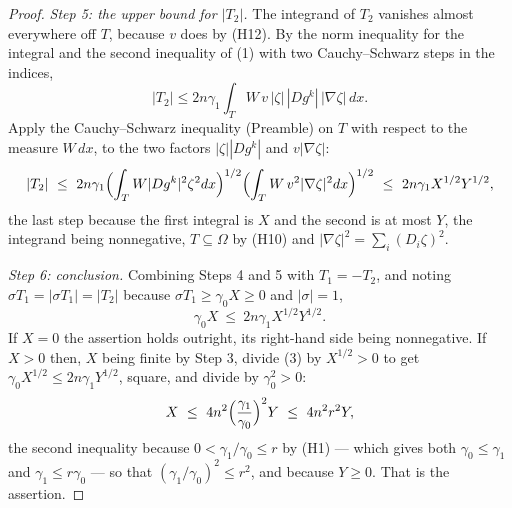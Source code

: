 \begin{proof}
\emph{Step 5: the upper bound for $|T_2|$.}  The integrand of $T_2$ vanishes
almost everywhere off $T$, because $v$ does by (H12).  By the norm inequality
for the integral and the second inequality of (1) with two Cauchy--Schwarz
steps in the indices,
\[
|T_2|\le2n\gamma_1\int_TW\,v\,|\zeta|\,|Dg^k|\,|\nabla\zeta|\,dx .
\]
Apply the Cauchy--Schwarz inequality (Preamble) on $T$ with respect to the
measure $W\,dx$, to the two factors $|\zeta||Dg^k|$ and $v|\nabla\zeta|$:
\[
|T_2|\ \le\ 2n\gamma_1
\Bigl(\int_TW|Dg^k|^2\zeta^2dx\Bigr)^{1/2}
\Bigl(\int_TW\,v^2|\nabla\zeta|^2dx\Bigr)^{1/2}
\ \le\ 2n\gamma_1X^{1/2}Y^{1/2},
\]
the last step because the first integral is $X$ and the second is at most $Y$,
the integrand being nonnegative, $T\subseteq\Omega$ by (H10) and
$|\nabla\zeta|^2=\sum_i(D_i\zeta)^2$.

\emph{Step 6: conclusion.}  Combining Steps 4 and 5 with $T_1=-T_2$, and noting
$\sigma T_1=|\sigma T_1|=|T_2|$ because $\sigma T_1\ge\gamma_0X\ge0$ and
$|\sigma|=1$,
\[
\gamma_0X\ \le\ 2n\gamma_1X^{1/2}Y^{1/2} .
\tag{3}
\]
If $X=0$ the assertion holds outright, its right-hand side being nonnegative.
If $X>0$ then, $X$ being finite by Step 3, divide (3) by $X^{1/2}>0$ to get
$\gamma_0X^{1/2}\le2n\gamma_1Y^{1/2}$, square, and divide by $\gamma_0^2>0$:
\[
X\ \le\ 4n^2\Bigl(\frac{\gamma_1}{\gamma_0}\Bigr)^2Y\ \le\ 4n^2r^2Y ,
\]
the second inequality because $0<\gamma_1/\gamma_0\le r$ by (H1) --- which gives
both $\gamma_0\le\gamma_1$ and $\gamma_1\le r\gamma_0$ --- so that
$(\gamma_1/\gamma_0)^2\le r^2$, and because $Y\ge0$.  That is the assertion.
\end{proof}
